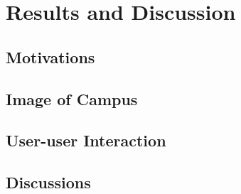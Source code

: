\chapter{Results and Discussion}\label{ch:5}

\section{Motivations}

\section{Image of Campus}

\section{User-user Interaction}

\section{Discussions}